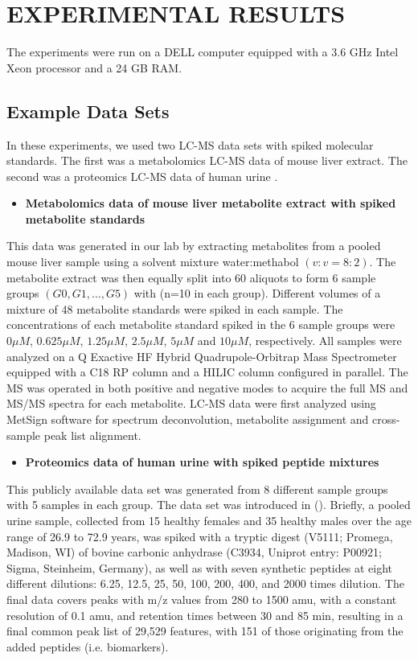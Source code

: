 \chapter{EXPERIMENTAL RESULTS}
The experiments were run on a DELL computer equipped with a 3.6 GHz Intel Xeon processor and a 24 GB RAM.
\section{Example Data Sets}
In these experiments, we used two LC-MS data sets with spiked molecular standards. The first was a metabolomics LC-MS data of mouse liver extract. The second was a proteomics LC-MS data of human urine \cite{christin}.
\begin{itemize}
	\item{ \textbf{Metabolomics data of mouse liver metabolite extract with spiked metabolite standards}}
\end{itemize}


This data was generated in our lab by extracting metabolites from a pooled mouse liver sample using a solvent mixture water:methabol $(v:v = 8:2)$. The metabolite extract was then equally split into 60 aliquots to form 6 sample groups $(G0, G1,\ldots,G5 )$ with (n=10 in each group). Different volumes of a mixture of 48 metabolite standards were spiked in each sample. The concentrations of each metabolite standard spiked in the 6 sample groups were $0 \mu M$, $0.625 \mu M$, $1.25 \mu M$, $2.5 \mu M$, $5 \mu M$  and $10 \mu M$, respectively. All samples were analyzed on a Q Exactive HF Hybrid Quadrupole-Orbitrap Mass Spectrometer equipped with a C18 RP column and a HILIC column configured in parallel. The MS was operated in both positive and negative modes to acquire the full MS and MS/MS spectra for each metabolite. LC-MS data were first analyzed using MetSign software \cite{metsign} for spectrum deconvolution, metabolite assignment and cross-sample peak list alignment.\\

\begin{itemize}
\item{\textbf{Proteomics data of human urine with spiked peptide mixtures} }
\end{itemize}

This publicly available data set was generated from 8 different sample groups with 5 samples in each
group. The data set was introduced in (\cite{christin}). Briefly, a pooled urine sample, collected from 15 healthy females and 35 healthy males over the age range of 26.9 to 72.9 years, was spiked with a tryptic digest (V5111; Promega, Madison, WI) of bovine carbonic anhydrase (C3934, Uniprot entry: P00921; Sigma, Steinheim, Germany), as well as with seven synthetic peptides at eight different dilutions: 6.25, 12.5, 25, 50, 100, 200, 400, and 2000 times dilution. The final data covers peaks with m/z values from 280 to 1500 amu, with a constant resolution of 0.1 amu, and retention times between 30 and 85 min, resulting in a final common peak list of 29,529 features, with 151 of those originating from the added peptides (i.e. biomarkers).


